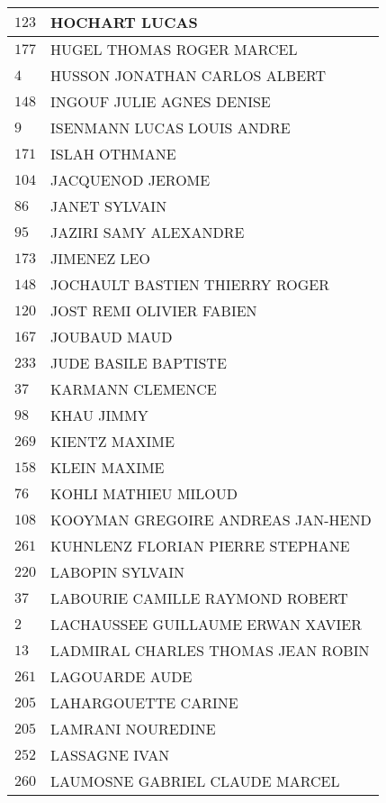 \begin{xltabular}{\linewidth}{|l|X|}
    \hline
    $123$ & HOCHART LUCAS \\
    \hline
    $177$ & HUGEL THOMAS ROGER MARCEL \\
    \hline
    $4$ & HUSSON JONATHAN CARLOS ALBERT \\
    \hline
    $148$ & INGOUF JULIE AGNES DENISE \\
    \hline
    $9$ & ISENMANN LUCAS LOUIS ANDRE \\
    \hline
    $171$ & ISLAH OTHMANE \\
    \hline
    $104$ & JACQUENOD JEROME \\
    \hline
    $86$ & JANET SYLVAIN \\
    \hline
    $95$ & JAZIRI SAMY ALEXANDRE \\
    \hline
    $173$ & JIMENEZ LEO \\
    \hline
    $148$ & JOCHAULT BASTIEN THIERRY ROGER \\
    \hline
    $120$ & JOST REMI OLIVIER FABIEN \\
    \hline
    $167$ & JOUBAUD MAUD \\
    \hline
    $233$ & JUDE BASILE BAPTISTE \\
    \hline
    $37$ & KARMANN CLEMENCE \\
    \hline
    $98$ & KHAU JIMMY \\
    \hline
    $269$ & KIENTZ MAXIME \\
    \hline
    $158$ & KLEIN MAXIME \\
    \hline
    $76$ & KOHLI MATHIEU MILOUD \\
    \hline
    $108$ & KOOYMAN GREGOIRE ANDREAS JAN-HEND \\
    \hline
    $261$ & KUHNLENZ FLORIAN PIERRE STEPHANE \\
    \hline
    $220$ & LABOPIN SYLVAIN \\
    \hline
    $37$ & LABOURIE CAMILLE RAYMOND ROBERT \\
    \hline
    $2$ & LACHAUSSEE GUILLAUME ERWAN XAVIER \\
    \hline
    $13$ & LADMIRAL CHARLES THOMAS JEAN ROBIN \\
    \hline
    $261$ & LAGOUARDE AUDE \\
    \hline
    $205$ & LAHARGOUETTE CARINE \\
    \hline
    $205$ & LAMRANI NOUREDINE \\
    \hline
    $252$ & LASSAGNE IVAN \\
    \hline
    $260$ & LAUMOSNE GABRIEL CLAUDE MARCEL \\

\end{xltabular}
